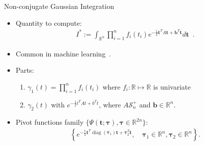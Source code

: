 \documentclass{beamer}
\renewcommand{\t}{\mathbf{t}}
\newcommand{\diag}[1]{\mathop{\textrm{diag}}\left(#1\right)}
\newcommand{\transp}{^{T}}
\def\A{A}
\def\btau{{\bm{\tau}}}
\renewcommand{\Re}{\mathbb{R}}
\begin{document}
\begin{frame}{Non-conjugate Gaussian Integration}

\begin{itemize}
	\item Quantity to compute:
		\begin{eqnarray} 
		I^*:=\int_{\Re^n}  \prod_{i=1}^n f_i(t_i)
		e^{-\frac 12 \t\transp \A \t + \bm b\transp \t} d\t
		\enspace.
		\label{univ-gaussian-integral} 
		\end{eqnarray}
	\item Common in machine learning~\citep{seeger2010gaussian}.
	\item Parts:
		\begin{enumerate}
		\item $\gamma_1(t)=\prod_{i=1}^n f_i(t_i)$ where  $f_i:\Re\mapsto \Re$ is univariate
		\item $\gamma_2(t)$ with $e^{-\frac 12 t\transp \A t + b\transp t}$, where $A\mathcal{S}_n^+$ and $\bm b\in\Re^n$.
		\end{enumerate}
	\item Pivot functions family $\{\Psi(\t;\btau) ,\btau\in\Re^{2n}\}$:
		\begin{eqnarray}
			\left\lbrace
				e^{-\frac 12 \t\transp\diag{\btau_1}\t +  \btau_2\transp\t},
				\quad \btau_1\in\Re^n,\btau_2 \in \Re^n 
			\right\rbrace
		.
		\label{Gaussian-pivot-functions}
		\end{eqnarray}
\end{itemize}
\end{frame}
\end{document}
